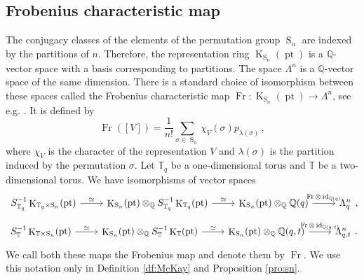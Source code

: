 \documentclass[12pt,a4paper]{amsart}
\theoremstyle{plain}
\theoremstyle{definition}
\theoremstyle{remark}
\newcommand{\Perm}{\operatorname{S}}
\newcommand{\id}{\operatorname{id}}
\newcommand{\pt}{\operatorname{pt}}
\newcommand{\QQ}{\mathbb{Q}}
\newcommand{\TT}{\mathbb{T}}
\newcommand{\Tq}{{\mathbb{T}_q}}
\newcommand{\Fr}{\operatorname{Fr}}
\DeclareMathOperator{\KTh}{K}
\begin{document}
\subsection{Frobenius characteristic map} \label{s:Frob}
The conjugacy classes of the elements of the permutation group $\Perm_n$ are indexed by the partitions of $n$. Therefore, the representation ring $\KTh_{\Perm_n}(\pt)$ is a $\QQ$-vector space with a basis corresponding to partitions. The space $\Lambda^n$ is a $\QQ$-vector space of the same dimension. There is a standard choice of isomorphism between these spaces called the Frobenius characteristic map $\Fr\colon \KTh_{\Perm_n}(\pt) \to \Lambda^n$, see e.g. \cite[Section 7.18]{Stanley}. It is defined by 
$$\Fr([V])=\frac{1}{n!}\sum_{\sigma\in \Perm_n}\chi_V(\sigma) p_{\lambda(\sigma)}\,,$$
where $\chi_V$ is the character of the representation $V$ and $\lambda(\sigma)$ is the partition induced by the permutation $\sigma$.
\noindent Let $\Tq$ be a one-dimensional torus and $\TT$ be a two-dimensional torus. We have isomorphisms of vector spaces
$$\begin{tikzcd}
	{S^{-1}_{\Tq}\KTh_{\Tq\times\Perm_n}(\pt)} & {\KTh_{\Perm_n}(\pt)\otimes_\QQ S^{-1}_{\Tq}\KTh_{\Tq}(\pt)} & {\KTh_{\Perm_n}(\pt)\otimes_\QQ \QQ(q)} & {\Lambda^n_q}
	\arrow["\simeq", from=1-1, to=1-2]
	\arrow["\simeq", from=1-2, to=1-3]
	\arrow["{\Fr\otimes \id_{\QQ(q)}}", from=1-3, to=1-4]
\end{tikzcd},$$
$$\begin{tikzcd}
	{S^{-1}_{\TT}\KTh_{\TT\times\Perm_n}(\pt)} & {\KTh_{\Perm_n}(\pt)\otimes_\QQ S^{-1}_{\TT}\KTh_{\TT}(\pt)} & {\KTh_{\Perm_n}(\pt)\otimes_\QQ \QQ(q,t)} & {\Lambda^n_{q,t}}
	\arrow["\simeq", from=1-1, to=1-2]
	\arrow["\simeq", from=1-2, to=1-3]
	\arrow["{\Fr\otimes \id_{\QQ(q,t)}}", from=1-3, to=1-4]
\end{tikzcd}.$$
We call both these maps the Frobenius map and denote them by $\Fr$. We use this notation only in Definition \ref{df:McKay} and Proposition \ref{pro:sn}.
\end{document}

